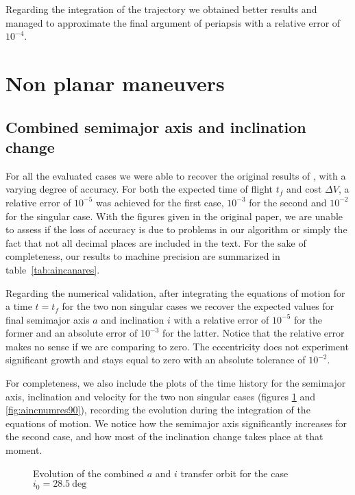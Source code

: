 Regarding the integration of the trajectory we obtained better results and managed to approximate the final argument of periapsis with a relative error of $10^{-4}$.

\section{Non planar maneuvers} \label{sec:resnonplanar}

\subsection{Combined semimajor axis and inclination change} \label{sec:resedelbaum}

For all the evaluated cases we were able to recover the original results of \cite{kechichian1997reformulation}, with a varying degree of accuracy. For both the expected time of flight $t_f$ and cost $\Delta V$, a relative error of $10^{-5}$ was achieved for the first case, $10^{-3}$ for the second and $10^{-2}$ for the singular case. With the figures given in the original paper, we are unable to assess if the loss of accuracy is due to problems in our algorithm or simply the fact that not all decimal places are included in the text. For the sake of completeness, our results to machine precision are summarized in table~\ref{tab:aincanares}.

Regarding the numerical validation, after integrating the equations of motion for a time $t = t_f$ for the two non singular cases we recover the expected values for final semimajor axis $a$ and inclination $i$ with a relative error of $10^{-5}$ for the former and an absolute error of $10^{-3}$ for the latter. Notice that the relative error makes no sense if we are comparing to zero. The eccentricity does not experiment significant growth and stays equal to zero with an absolute tolerance of $10^{-2}$.

For completeness, we also include the plots of the time history for the semimajor axis, inclination and velocity for the two non singular cases (figures \ref{fig:aincnumres28} and \ref{fig:aincnumres90}), recording the evolution during the integration of the equations of motion. We notice how the semimajor axis significantly increases for the second case, and how most of the inclination change takes place at that moment.

\begin{figure}%
\begin{subfigure}[b]{0.5\textwidth}
\centering
\resizebox{1.0\textwidth}{!}{

}
\end{subfigure}
\begin{subfigure}[b]{0.5\textwidth}
\centering
\resizebox{1.0\textwidth}{!}{

}
\end{subfigure}
\caption{Evolution of the combined $a$ and $i$ transfer orbit for the case $i_0 = 28.5~\text{deg}$}
\label{fig:aincnumres28}
\end{figure}

